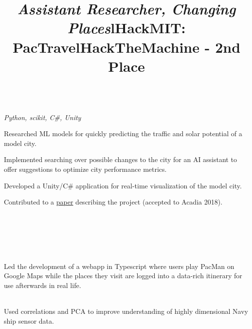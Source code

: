 \documentclass[margin,line,11pt,letterpaper]{res}
\let\oldsection\section
\renewcommand{\section}[1]{\vspace{-2mm}\oldsection{\small\sc {#1}}}
\begin{document}
\begin{resume}
    \title{\textit{Assistant Researcher, Changing Places}}
    \begin{position}
        \vspace{-3mm}\\
        \emph{Python, scikit, C\#, Unity}
        \begin{list2}
            \item Researched ML models for quickly predicting the traffic and solar potential of a model city.
            \item Implemented searching over possible changes to the city for an AI assistant to offer suggestions to optimize city performance metrics.
            \item Developed a Unity/C\# application for real-time visualization of the model city.
            \item Contributed to a \href{https://bit.ly/2xqEsnW}{paper} describing the project (accepted to Acadia 2018).
        \end{list2}
    \end{position}

    \section{Projects + Competitions}
    
    \begin{format}
        \title{l}\\
        \body\\
    \end{format}
    
    \title{\textbf{HackMIT: PacTravel}}
    \begin{position}
        \vspace{-3mm} \\
        Led the development of a webapp in Typescript where users play PacMan on Google Maps while the places they visit are logged into a data-rich itinerary for use afterwards in real life.
    \end{position}
    
    \title{\textbf{HackTheMachine - 2nd Place}}
    \begin{position}
        \vspace{-3mm} \\
        Used correlations and PCA to improve understanding of highly dimensional Navy ship sensor data.
    \end{position}
    

\end{resume}
\end{document}
